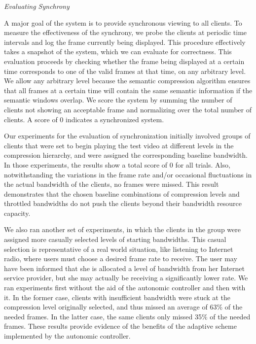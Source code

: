 \documentclass{sig-alternate}
\begin{document}

\textit{Evaluating Synchrony}

A major goal of the system is to provide synchronous viewing to all
clients.  To measure the effectiveness of the synchrony, we probe the
clients at periodic time intervals and log the frame currently being
displayed.  This procedure effectively takes a snapshot of the system,
which we can evaluate for correctness.  This evaluation proceeds by
checking whether the frame being displayed at a certain time
corresponds to one of the valid frames at that time, on any arbitrary
level.  We allow any arbitrary level because the semantic compression
algorithm ensures that all frames at a certain time will contain the
same semantic information if the semantic windows overlap.  We score
the system by summing the number of clients not showing an acceptable
frame and normalizing over the total number of clients.  A score of 0
indicates a synchronized system.

Our experiments for the evaluation of synchronization initially
involved groups of clients that were set to begin playing the test
video at different levels in the compression hierarchy, and were
assigned the corresponding baseline bandwidth. In those experiments,
the results show a total score of 0 for all trials. Also,
notwithstanding the variations in the frame rate and/or occasional
fluctuations in the actual bandwidth of the clients, no frames were
missed.  This result demonstrates that the chosen baseline
combinations of compression levels and throttled bandwidths do not
push the clients beyond their bandwidth resource capacity.

We also ran another set of experiments, in which the clients in the
group were assigned more casually selected levels of starting
bandwidths.  This casual selection is representative of a real world
situation, like listening to Internet radio, where users must choose a
desired frame rate to receive.  The user may have been informed that
she is allocated a level of bandwidth from her Internet service
provider, but she may actually be receiving a significantly lower
rate.  We ran experiments first without the aid of the autonomic
controller and then with it. In the former case, clients with
insufficient bandwidth were stuck at the compression level originally
selected, and thus missed an average of 63\% of the needed frames.  In
the latter case, the same clients only missed 35\% of the needed
frames.  These results provide evidence of the benefits of the
adaptive scheme implemented by the autonomic controller.
\end{document}
